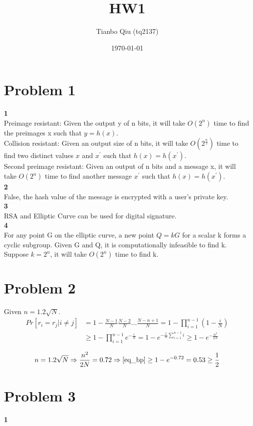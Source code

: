 \documentclass[latterpaper]{article}
\newcommand\blankpage{%
    \null
    \thispagestyle{empty}%
    \addtocounter{page}{-1}%
    \newpage}
\begin{document}
\title{HW1}
\author{Tianbo Qiu (tq2137)}
\date{\today}
\maketitle

\section*{Problem 1}
{\bf\normalsize 1} \\
Preimage resistant: Given the output y of n bits, it will take $O(2^n)$ time to find the preimages x such that $y=h(x)$.\\
Collision resistant: Given an output size of n bits, it will take $O(2^{\frac{n}{2}})$ time to find two distinct values $x$ and $x^{\prime}$ such that $h(x)=h(x^{\prime})$. \\
Second preimage resistant: Given an output of n bits and a message x, it will take $O(2^n)$ time to find another message $x^{\prime}$ such that $h(x)=h(x^{\prime})$.\\
{\bf 2} \\
False, the hash value of the message is encrypted with a user's private key.\\
{\bf 3} \\
RSA and Elliptic Curve can be used for digital signature. \\
{\bf 4} \\
For any point G on the elliptic curve, a new point $Q=kG$ for a scalar k forms a cyclic subgroup. Given G and Q, it is computationally infeasible to find k. Suppose $k=2^n$, it will take $O(2^n)$ time to find k.

\section*{Problem 2}
Given $n=1.2\sqrt{N}$.
\begin{equation}
\label{eq_bp}
\begin{split}
Pr[r_i=r_j | i \neq j] & =1-\frac{N-1}{N}\frac{N-2}{N}\dots\frac{N-n+1}{N}=1-\prod_{i=1}^{n-1} (1-\frac{i}{N}) \\
& \geq 1-\prod_{i=1}^{n-1}e^{-\frac{i}{N}}=1-e^{-\frac{1}{N}\sum_{i=1}^{n-1}i} \geq 1-e^{-\frac{n^2}{2N}}
\end{split}
\end{equation}

\begin{equation}
n=1.2\sqrt{N} \Rightarrow \frac{n^2}{2N}=0.72 \Rightarrow \eqref{eq_bp} \geq 1-e^{-0.72}=0.53\geq \frac{1}{2}
\end{equation}

\section*{Problem 3}
\afterpage{\blankpage}
{\bf 1} \\
\end{document}
